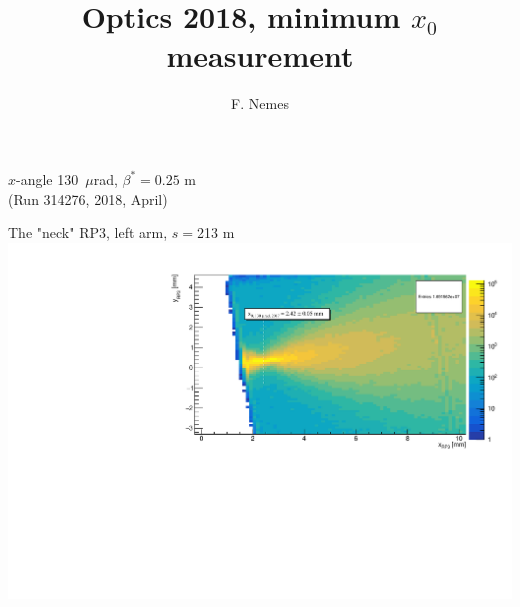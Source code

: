 \documentclass{beamer}
\title[PPS, Proton POG Meeting]{\large Optics 2018, minimum $x_{0}$ measurement}\vspace{10mm}
\subtitle{\tiny }
\author{F. Nemes}
\begin{document}
\begin{frame}
	\titlepage
\end{frame}

\begin{frame}
	\begin{center}
	\Large
	$x$-angle 130~$\mu$rad, $\beta^{*}=0.25$ m\\ {\small (Run 314276, 2018, April)}
	\end{center}
\end{frame}

\begin{frame}\scriptsize
	\begin{block}{The "neck"}
	RP3, left arm, $s=$213 m
             \includegraphics[width=1.0\textwidth]{fig1.pdf}\\
	\end{block}
	
\end{frame}
\end{document}
